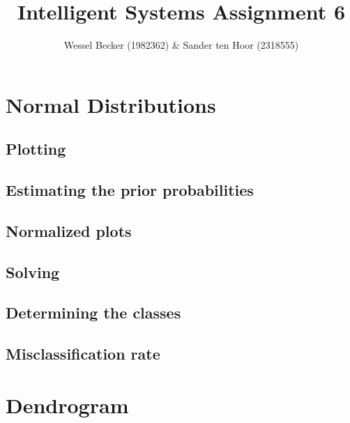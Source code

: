 \documentclass[10pt,a4paper]{article}
\begin{document}
\title{Intelligent Systems Assignment 6}
\author{Wessel Becker (1982362) \& Sander ten Hoor (2318555)}
\maketitle

\newcommand{\simplesubfigure}[3]{
  \noindent\begin{minipage}{.31\linewidth}
    \begin{center}
      \texttt{[image: \#1]}
      \captionof{figure}{#2}
      \label{#3}
    \end{center}
  \end{minipage}\hspace{7pt}
}
\newcommand{\simplefigure}[3]{
	\noindent\begin{figure}[H]
  	\centering
    	\makebox[.6\textwidth]
    	{
    		\texttt{[image: \#1]}
 		} \\
  		\caption{#2}
  		\label{#3}
	\end{figure}
}
\newcommand{\mcode}[2]{
	\label{#2}
}

\section{Normal Distributions}
\subsection{Plotting}
\subsection{Estimating the prior probabilities}
\subsection{Normalized plots}
\subsection{Solving}
\subsection{Determining the classes}
\subsection{Misclassification rate}

\section{Dendrogram}
\end{document}
